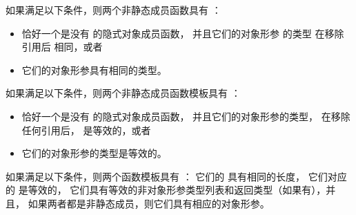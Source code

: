 \pnum
如果满足以下条件，则两个非静态成员函数具有
：
\begin{itemize}
\item
恰好一个是没有  的隐式对象成员函数，
并且它们的对象形参 的类型
在移除引用后
相同，或者
\item
它们的对象形参具有相同的类型。
\end{itemize}
%
如果满足以下条件，则两个非静态成员函数模板具有
：
\begin{itemize}
\item
恰好一个是没有  的隐式对象成员函数，
并且它们的对象形参的类型，
在移除任何引用后，
是等效的，或者
\item
它们的对象形参的类型是等效的。
\end{itemize}
%
如果满足以下条件，则两个函数模板具有
：
它们的  具有相同的长度，
它们对应的  是等效的，
它们具有等效的非对象形参类型列表和返回类型（如果有），并且，
如果两者都是非静态成员，则它们具有相应的对象形参。

